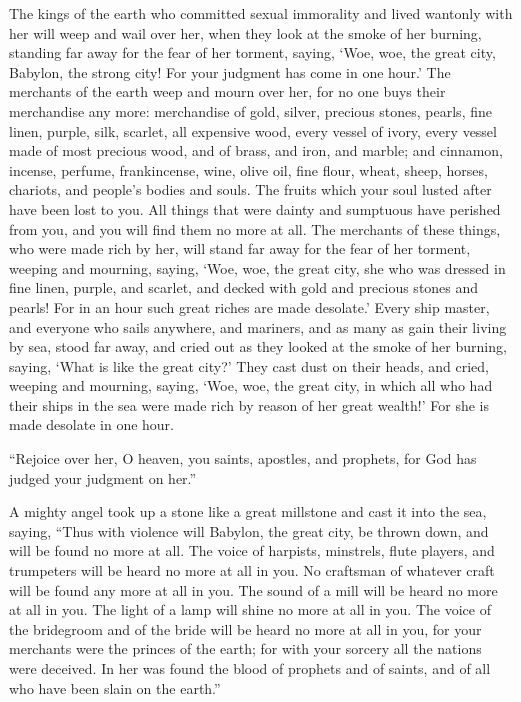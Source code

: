  The kings of the earth who committed sexual immorality
and lived wantonly with her will weep and wail over her, when they look
at the smoke of her burning,  standing far away for the
fear of her torment, saying, `Woe, woe, the great city, Babylon, the
strong city! For your judgment has come in one hour.' 
The merchants of the earth weep and mourn over her, for no one buys
their merchandise any more:  merchandise of gold, silver,
precious stones, pearls, fine linen, purple, silk, scarlet, all
expensive wood, every vessel of ivory, every vessel made of most
precious wood, and of brass, and iron, and marble;  and
cinnamon, incense, perfume, frankincense, wine, olive oil, fine flour,
wheat, sheep, horses, chariots, and people's bodies and souls.
 The fruits which your soul lusted after have been lost
to you. All things that were dainty and sumptuous have perished from
you, and you will find them no more at all.  The
merchants of these things, who were made rich by her, will stand far
away for the fear of her torment, weeping and mourning, 
saying, `Woe, woe, the great city, she who was dressed in fine linen,
purple, and scarlet, and decked with gold and precious stones and
pearls!  For in an hour such great riches are made
desolate.' Every ship master, and everyone who sails anywhere, and
mariners, and as many as gain their living by sea, stood far away,
 and cried out as they looked at the smoke of her
burning, saying, `What is like the great city?'  They
cast dust on their heads, and cried, weeping and mourning, saying, `Woe,
woe, the great city, in which all who had their ships in the sea were
made rich by reason of her great wealth!' For she is made desolate in
one hour.

 ``Rejoice over her, O heaven, you saints, apostles, and
prophets, for God has judged your judgment on her.''

 A mighty angel took up a stone like a great millstone
and cast it into the sea, saying, ``Thus with violence will Babylon, the
great city, be thrown down, and will be found no more at all.
 The voice of harpists, minstrels, flute players, and
trumpeters will be heard no more at all in you. No craftsman of whatever
craft will be found any more at all in you. The sound of a mill will be
heard no more at all in you.  The light of a lamp will
shine no more at all in you. The voice of the bridegroom and of the
bride will be heard no more at all in you, for your merchants were the
princes of the earth; for with your sorcery all the nations were
deceived.  In her was found the blood of prophets and of
saints, and of all who have been slain on the earth.''

